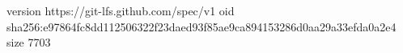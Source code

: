 version https://git-lfs.github.com/spec/v1
oid sha256:e97864fc8dd112506322f23daed93f85ae9ca894153286d0aa29a33efda0a2e4
size 7703
